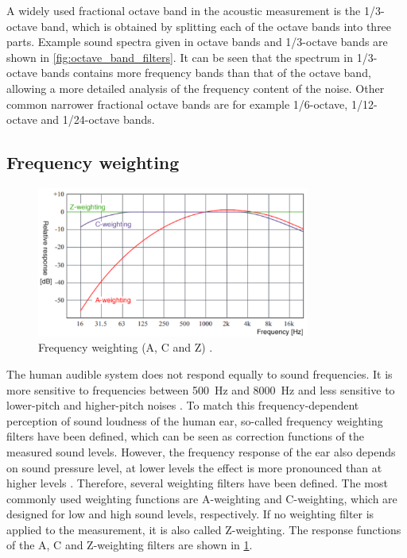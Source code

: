 \noindent A widely used fractional octave band in the acoustic measurement is the 1/3-octave band, which is obtained by splitting each of the octave bands into three parts. Example sound spectra given in octave bands and 1/3-octave bands are shown in \cref{fig:octave_band_filters}. It can be seen that the spectrum in 1/3-octave bands contains more frequency bands than that of the octave band, allowing a more detailed analysis of the frequency content of the noise. Other common narrower fractional octave bands are for example 1/6-octave, 1/12-octave and 1/24-octave bands.

\newpage
\subsection{Frequency weighting}

\begin{figure}[H]
	\centering
	\includegraphics[width=0.8\textwidth]{fig/frequency_weighting.png}
	\caption{Frequency weighting (A, C and Z) \cite{Frquency_weighting}.}
	\label{fig:weighting}
\end{figure}

The human audible system does not respond equally to sound frequencies. It is more sensitive to frequencies between \SI{500}{\hertz} and \SI{8000}{\hertz} and less sensitive to lower-pitch and higher-pitch noises \cite{weighting_filters}. To match this frequency-dependent perception of sound loudness of the human ear, so-called frequency weighting filters have been defined, which can be seen as correction functions of the measured sound levels. However, the frequency response of the ear also depends on sound pressure level, at lower levels the effect is more pronounced than at higher levels \cite{heutschi_lecture_2016}. Therefore, several weighting filters have been defined. The most commonly used weighting functions are A-weighting and C-weighting, which are designed for low and high sound levels, respectively. If no weighting filter is applied to the measurement, it is also called Z-weighting. The response functions of the A, C and Z-weighting filters are shown in \cref{fig:weighting}.

